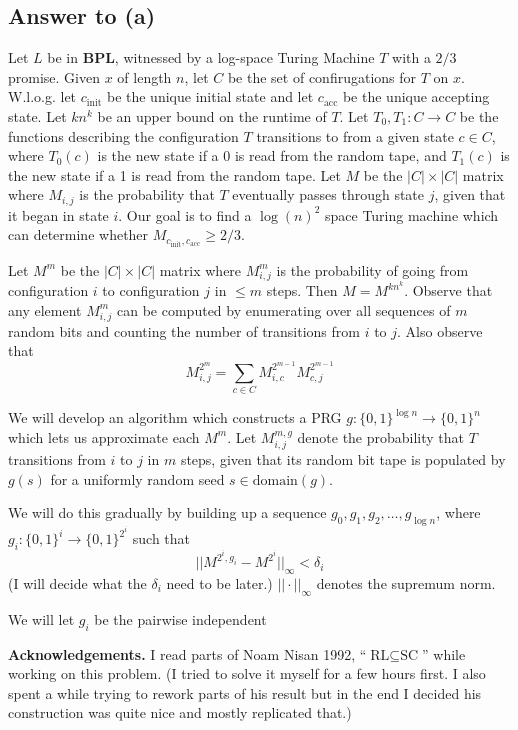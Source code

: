 \documentclass{article}
\def \BPL{{\mathbf{BPL}}}
\begin{document}
\subsection*{Answer to (a)}

Let $L$ be in $\BPL$, witnessed by a log-space Turing Machine $T$ with a $2/3$ promise.
Given $x$ of length $n$, let $C$ be the set of confirugations for $T$ on $x$.
W.l.o.g. let $c_\text{init}$ be the unique initial state and let $c_\text{acc}$ be the unique accepting state.
Let $kn^k$ be an upper bound on the runtime of $T$.
Let $T_0, T_1 : C \to C$ be the functions describing the configuration $T$ transitions to from a given state $c \in C$, where $T_0(c)$ is the new state if a 0 is read from the random tape, and $T_1(c)$ is the new state if a 1 is read from the random tape.
Let $M$ be the $|C| \times |C|$ matrix where $M_{i, j}$ is the probability that $T$ eventually passes through state $j$, given that it began in state $i$.
Our goal is to find a $\log(n)^2$ space Turing machine which can determine whether $M_{c_\text{init}, c_\text{acc}} \geq 2/3$.

Let $M^m$ be the $|C| \times |C|$ matrix where $M^m_{i, j}$ is the probability of going from configuration $i$ to configuration $j$ in $\leq m$ steps.
Then $M = M^{kn^k}$.
Observe that any element $M^m_{i, j}$ can be computed by enumerating over all sequences of $m$ random bits and counting the number of transitions from $i$ to $j$.
Also observe that
$$
M_{i, j}^{2^m} = \sum_{c \in C} M_{i, c}^{2^{m-1}} M_{c, j}^{2^{m-1}}
$$

We will develop an algorithm which constructs a PRG $g : \{0, 1\}^{\log n} \to \{0, 1\}^n$ which lets us approximate each $M^m$.
Let $M^{m, g}_{i, j}$ denote the probability that $T$ transitions from $i$ to $j$ in $m$ steps, given that its random bit tape is populated by $g(s)$ for a uniformly random seed $s \in \text{domain}(g)$.

We will do this gradually by building up a sequence $g_0, g_1, g_2, \dots, g_{\log n}$, where $g_i : \{0, 1\}^i \to \{0, 1\}^{2^i}$ such that
$$
|| M^{2^i, g_i} - M^{2^i}||_{\infty} < \delta_i
$$
(I will decide what the $\delta_i$ need to be later.)  $|| \cdot ||_\infty$ denotes the supremum norm.

We will let $g_i$ be the pairwise independent 



\medskip
\noindent \textbf{Acknowledgements.}  I read parts of Noam Nisan 1992, ``$\text{RL} \subseteq \text{SC}$'' while working on this problem.  (I tried to solve it myself for a few hours first.
I also spent a while trying to rework parts of his result but in the end I decided his construction was quite nice and mostly replicated that.)
\end{document}
